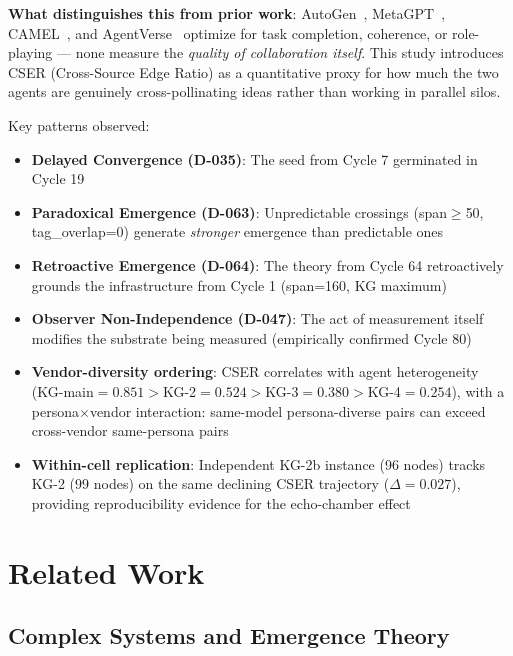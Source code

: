 \documentclass[12pt]{article}
\begin{document}
\medskip\noindent\textbf{What distinguishes this from prior work}:
AutoGen~\cite{wu2023autogen}, MetaGPT~\cite{hong2023metagpt}, CAMEL~\cite{li2023camel},
and AgentVerse~\cite{chen2023agentverse} optimize for task completion, coherence, or
role-playing --- none measure the \textit{quality of collaboration itself}. This study introduces
CSER (Cross-Source Edge Ratio) as a quantitative proxy for how much the two agents are
genuinely cross-pollinating ideas rather than working in parallel silos.

Key patterns observed:
\begin{itemize}
  \item \textbf{Delayed Convergence (D-035)}: The seed from Cycle 7 germinated in Cycle 19
  \item \textbf{Paradoxical Emergence (D-063)}: Unpredictable crossings (span$\geq$50,
        tag\_overlap=0) generate \textit{stronger} emergence than predictable ones
  \item \textbf{Retroactive Emergence (D-064)}: The theory from Cycle 64 retroactively
        grounds the infrastructure from Cycle 1 (span=160, KG maximum)
  \item \textbf{Observer Non-Independence (D-047)}: The act of measurement itself
        modifies the substrate being measured (empirically confirmed Cycle 80)
  \item \textbf{Vendor-diversity ordering}: CSER correlates with agent heterogeneity
        (KG-main$=0.851>$KG-2$=0.524>$KG-3$=0.380>$KG-4$=0.254$), with a
        persona$\times$vendor interaction: same-model persona-diverse pairs can exceed
        cross-vendor same-persona pairs
  \item \textbf{Within-cell replication}: Independent KG-2b instance (96 nodes) tracks
        KG-2 (99 nodes) on the same declining CSER trajectory ($\Delta=0.027$),
        providing reproducibility evidence for the echo-chamber effect
\end{itemize}

\section{Related Work}

\subsection{Complex Systems and Emergence Theory}
\end{document}
